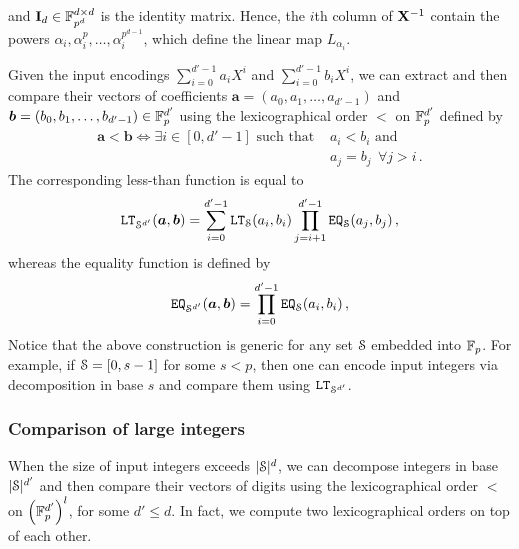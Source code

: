   and $\mI_d \in \F_{p^d}^{d \times d}$ is the identity matrix.
  Hence, the $i$th column of $\inv{\mX}$ contain the powers $\alpha_i, \alpha_i^p, \dots, \alpha_i^{p^{d-1}}$, which define the linear map $L_{\alpha_i}$.

  Given the input encodings $\sum_{i=0}^{d'-1} a_i X^i$ and $\sum_{i=0}^{d'-1} b_i X^i$, we can extract and then compare their vectors of coefficients $\bm{a} = (a_0,a_1,\ldots,a_{d'-1})$ and $\bm{b} = (b_0,b_1,\ldots,b_{d'-1}) \in \F_p^{d'}$ using the lexicographical order $\bm{<}$ on $\F_{p}^{d'}$ defined by
   \begin{align*}
      \bm{a} \bm{<} \bm{b} \Leftrightarrow \exists i\in[0,d'-1] \text{ such that } & a_i < b_i \text{ and } \\
       & a_j = b_j ~~ \forall j > i \,.
    \end{align*}
    The corresponding less-than function is equal to
    \begin{align*}
      \LT_{\S^{d'}}(\bm{a}, \bm{b}) = \sum_{i=0}^{d'-1} \LT_{\S}(a_{i}, b_{i}) \prod_{j=i+1}^{d'-1} \EQ_{\S}(a_{j}, b_{j})\,,
    \end{align*}
    whereas the equality function is defined by
    \begin{align*}
      \EQ_{\S^{d'}}(\bm{a}, \bm{b}) = \prod_{i=0}^{d'-1} \EQ_{\S}(a_{i}, b_{i})\,,
    \end{align*}
    Notice that the above construction is generic for any set $\S$ embedded into $\F_p$.
    For example, if $\S = [0,s-1]$ for some $s < p$, then one can encode input integers via decomposition in base $s$ and compare them using $\LT_{\S^{d'}}$.

\subsubsection{Comparison of large integers}\label{sec:comparison_of_large_integers}
When the size of input integers exceeds $|\S|^d$, we can decompose integers in base $|\S|^{d'}$ and then compare their vectors of digits using the lexicographical order $\bm{<}$ on $\left(\F_{p}^{d'}\right)^l$, for some $d' \le d$.
In fact, we compute two lexicographical orders on top of each other.

